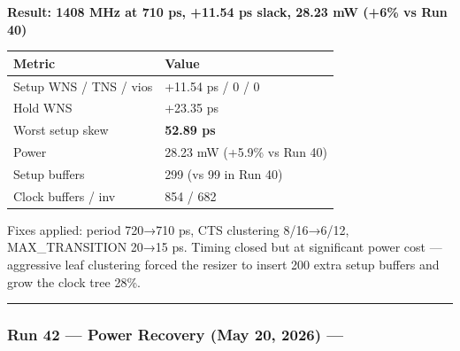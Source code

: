 \begin{record}

\textbf{Result: 1408 MHz at 710 ps, +11.54 ps slack, 28.23 mW (+6\% vs
Run 40)}

{
\begin{longtable}[]{@{}ll@{}}
\toprule\noalign{}
Metric & Value \\
\midrule\noalign{}
\endhead
\bottomrule\noalign{}
\endlastfoot
Setup WNS / TNS / vios & +11.54 ps / 0 / 0 \\
Hold WNS & +23.35 ps \\
Worst setup skew & \textbf{52.89 ps} \warn{} \\
Power & 28.23 mW (+5.9\% vs Run 40) \\
Setup buffers & 299 (vs 99 in Run 40) \\
Clock buffers / inv & 854 / 682 \\
\end{longtable}
}

Fixes applied: period 720→710 ps, CTS clustering
8/\allowbreak{}16→6/\allowbreak{}12, MAX\_\allowbreak{}TRANSITION 20→15
ps. Timing closed but at significant power cost --- aggressive leaf
clustering forced the resizer to insert 200 extra setup buffers and grow
the clock tree 28\%.

\begin{center}\rule{0.5\linewidth}{0.5pt}\end{center}

\end{record}

\subsubsection{\texorpdfstring{Run 42 --- Power Recovery \ok{} (May 20,
2026) ---
}{Run 42 --- Power Recovery  (May 20, 2026) --- }}\label{cr:run:asap7-cpu:run-42-power-recovery-white-check-mark-may-20-2026-run-2026-05-20-05-56-25}

